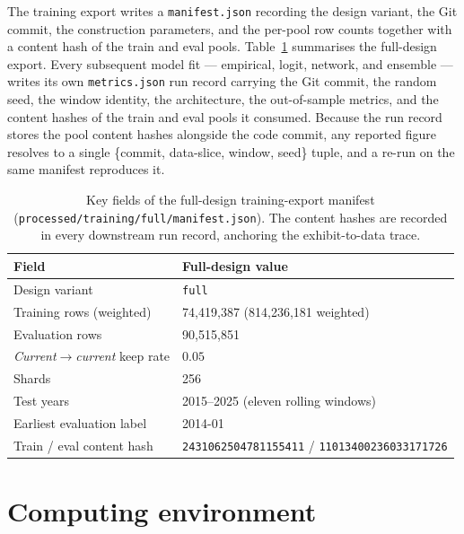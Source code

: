 The training export writes a \texttt{manifest.json} recording the
design variant, the Git commit, the construction parameters, and the
per-pool row counts together with a content hash of the train and eval
pools. Table~\ref{tab:repro-manifest} summarises the full-design
export. Every subsequent model fit --- empirical, logit, network, and
ensemble --- writes its own \texttt{metrics.json} run record carrying
the Git commit, the random seed, the window identity, the architecture,
the out-of-sample metrics, and the content hashes of the train and eval
pools it consumed. Because the run record stores the pool content
hashes alongside the code commit, any reported figure resolves to a
single \{commit, data-slice, window, seed\} tuple, and a re-run on the
same manifest reproduces it.

\begin{table}[htbp]
\centering
\small
\renewcommand{\arraystretch}{1.2}
\begin{tabularx}{\textwidth}{@{}lX@{}}
\toprule
\textbf{Field} & \textbf{Full-design value} \\
\midrule
Design variant            & \texttt{full} \\
Training rows (weighted)  & 74{,}419{,}387 \;(814{,}236{,}181 weighted) \\
Evaluation rows           & 90{,}515{,}851 \\
\emph{Current}$\to$\emph{current} keep rate & $0.05$ \\
Shards                    & 256 \\
Test years                & 2015--2025 (eleven rolling windows) \\
Earliest evaluation label & 2014-01 \\
Train / eval content hash & \texttt{2431062504781155411} / \texttt{11013400236033171726} \\
\bottomrule
\end{tabularx}
\caption[Full-design training-export manifest]{Key fields of the
full-design training-export manifest
(\texttt{processed/training/full/manifest.json}). The content hashes are
recorded in every downstream run record, anchoring the
exhibit-to-data trace.}
\label{tab:repro-manifest}
\end{table}

\section{Computing environment}
\label{sec:repro-env}

